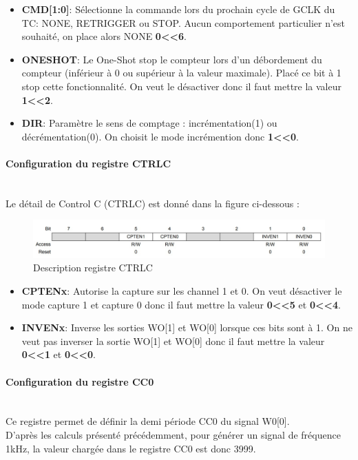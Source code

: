 \documentclass[a4paper]{article}
\begin{document}
	\begin{itemize}
		\item {\bf CMD[1:0]}: Sélectionne la commande lors du prochain cycle de GCLK du TC: NONE, RETRIGGER ou STOP. Aucun comportement particulier n’est souhaité, on place alors NONE {\bf 0\textless\textless6}.~~\\
		\item {\bf ONESHOT}: Le One-Shot stop le compteur lors d’un débordement du compteur (inférieur à 0 ou supérieur à la valeur maximale). Placé ce bit à 1 stop cette fonctionnalité. On veut le désactiver donc il faut mettre la valeur {\bf 1\textless\textless2}.~~\\
		\item {\bf DIR}: Paramètre le sens de comptage : incrémentation(1) ou décrémentation(0). On choisit le mode incrémention donc {\bf 1\textless\textless0}.~~\\
	\end{itemize}
	
	\paragraph{Configuration du registre CTRLC} 
	~~\\
	Le détail de Control C (CTRLC) est donné dans la figure ci-dessous :
	\begin{figure}[H]
		\centering
		\includegraphics[width=0.9\linewidth]{CTRLC.jpg}
		\caption{Description registre CTRLC}
	\end{figure}
	
	\begin{itemize}
		\item {\bf CPTENx}: Autorise la capture sur les channel 1 et 0. On veut désactiver le mode capture 1 et capture 0 donc il faut mettre la valeur {\bf 0\textless\textless5} et {\bf 0\textless\textless4}.~~\\
		\item {\bf INVENx}: Inverse les sorties WO[1] et WO[0] lorsque ces bits sont à 1. On ne veut pas inverser la sortie WO[1] et WO[0] donc il faut mettre la valeur {\bf 0\textless\textless1} et {\bf 0\textless\textless0}.~~\\
	\end{itemize}
	
	\paragraph{Configuration du registre CC0} 
	~~\\
	Ce registre permet de définir la demi période CC0 du signal W0[0]. \\
	D’après les calculs présenté précédemment, pour générer un signal de fréquence 1kHz, la valeur chargée dans le registre CC0 est donc 3999.\\
	
\end{document}
